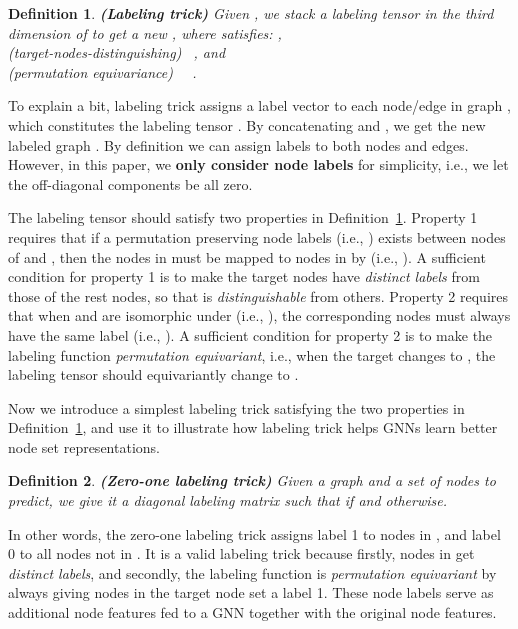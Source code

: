\documentclass{article}
\newtheorem{definition}{Definition}
\begin{document}
\begin{definition}\label{labelingtrick}
\textbf{(Labeling trick)} Given , we stack a labeling tensor  in the third dimension of  to get a new , where  satisfies: , \\
 (\textit{target-nodes-distinguishing}) ~, and\\
 (\textit{permutation equivariance}) ~~. 
\end{definition}



To explain a bit, labeling trick assigns a label vector to each node/edge in graph , which constitutes the labeling tensor . By concatenating  and , we get the new labeled graph . By definition we can assign labels to both nodes and edges. However, in this paper, we \textbf{only consider node labels} for simplicity, i.e., we let the off-diagonal components  be all zero.

The labeling tensor  should satisfy two properties in Definition~\ref{labelingtrick}. Property 1 requires that if a permutation  preserving node labels (i.e., ) exists between nodes of  and , then the nodes in  must be mapped to nodes in  by  (i.e., ). A sufficient condition for property 1 is to make the target nodes  have \textit{distinct labels} from those of the rest nodes, so that  is \textit{distinguishable} from others.
Property 2 requires that when  and  are isomorphic under  (i.e., ), the corresponding nodes  must always have the same label (i.e., ). A sufficient condition for property 2 is to make the labeling function \textit{permutation equivariant}, i.e., when the target  changes to , the labeling tensor  should equivariantly change to .












Now we introduce a simplest labeling trick satisfying the two properties in Definition~\ref{labelingtrick}, and use it to illustrate how labeling trick helps GNNs learn better node set representations.

\begin{definition}\label{zolabeling}
\textbf{(Zero-one labeling trick)} Given a graph  and a set of nodes  to predict, we give it a diagonal labeling matrix  such that  if  and  otherwise.
\end{definition}




In other words, the zero-one labeling trick assigns label 1 to nodes in , and label 0 to all nodes not in . It is a valid labeling trick because firstly, nodes in  get \textit{distinct labels}, and secondly, the labeling function is \textit{permutation equivariant} by always giving nodes in the target node set a label 1.
These node labels serve as additional node features fed to a GNN together with the original node features.
\end{document}
